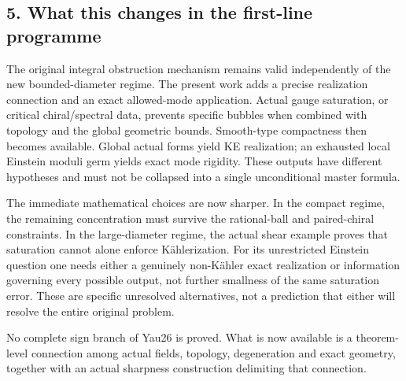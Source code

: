\documentclass[
  11pt,
]{article}
\begin{document}
\hypertarget{what-this-changes-in-the-first-line-programme}{%
\subsection{5. What this changes in the first-line
programme}\label{what-this-changes-in-the-first-line-programme}}

The original integral obstruction mechanism remains valid independently
of the new bounded-diameter regime. The present work adds a precise
realization connection and an exact allowed-mode application. Actual
gauge saturation, or critical chiral/spectral data, prevents specific
bubbles when combined with topology and the global geometric bounds.
Smooth-type compactness then becomes available. Global actual forms
yield KE realization; an exhausted local Einstein moduli germ yields
exact mode rigidity. These outputs have different hypotheses and must
not be collapsed into a single unconditional master formula.

The immediate mathematical choices are now sharper. In the compact
regime, the remaining concentration must survive the rational-ball and
paired-chiral constraints. In the large-diameter regime, the actual
shear example proves that saturation cannot alone enforce Kählerization.
For its unrestricted Einstein question one needs either a genuinely
non-Kähler exact realization or information governing every possible
output, not further smallness of the same saturation error. These are
specific unresolved alternatives, not a prediction that either will
resolve the entire original problem.

No complete sign branch of Yau26 is proved. What is now available is a
theorem-level connection among actual fields, topology, degeneration and
exact geometry, together with an actual sharpness construction
delimiting that connection.
\end{document}
